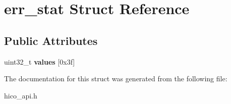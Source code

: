 \hypertarget{structerr__stat}{}\section{err\+\_\+stat Struct Reference}
\label{structerr__stat}
\subsection*{Public Attributes}
\begin{DoxyCompactItemize}
\item 
\mbox{\label{structerr__stat_a659e627af5963248da109c8e2404cd08}} 
uint32\+\_\+t {\bfseries values} \mbox{[}0x3f\mbox{]}
\end{DoxyCompactItemize}


The documentation for this struct was generated from the following file\+:\begin{DoxyCompactItemize}
\item 
hico\+\_\+api.\+h\end{DoxyCompactItemize}

